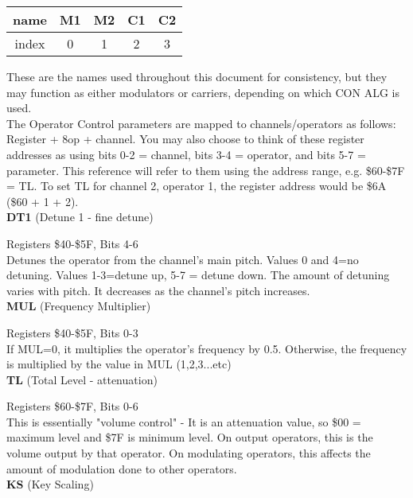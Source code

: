 \begin{tabular}{|c|c|c|c|c|}
	\hline
	name&M1&M2&C1&C2 \\ \hline
	index&0&1&2&3 \\ \hline
\end{tabular}

\vspace{16pt}

These are the names used throughout this document for consistency, but they may
function as either modulators or carriers, depending on which {\ttfamily CON}
ALG is used.\\

The Operator Control parameters are mapped to channels/operators as follows:
Register + 8\*op + channel. You may also choose to think of these register
addresses as using bits 0-2 = channel, bits 3-4 = operator, and bits 5-7 =
parameter. This reference will refer to them using the address range, e.g.
\$60-\$7F = TL. To set TL for channel 2, operator 1, the register address would
be \$6A (\$60 + 1 + 2).\\


{\bfseries DT1} (Detune 1 - fine detune)

Registers \$40-\$5F, Bits 4-6\\

Detunes the operator from the channel's main pitch. Values 0 and 4=no detuning.
Values 1-3=detune up, 5-7 = detune down.  The amount of detuning varies with
pitch. It decreases as the channel's pitch increases.\\

{\bfseries MUL} (Frequency Multiplier)

Registers \$40-\$5F, Bits 0-3\\

If MUL=0, it multiplies the operator's frequency by 0.5.  Otherwise, the
frequency is multiplied by the value in MUL (1,2,3...etc)\\

{\bfseries TL} (Total Level - attenuation)

Registers \$60-\$7F, Bits 0-6\\

This is essentially "volume control" - It is an attenuation value, so \$00 =
maximum level and \$7F is minimum level. On output operators, this is the
volume output by that operator. On modulating operators, this affects the
amount of modulation done to other operators.\\

{\bfseries KS} (Key Scaling)

